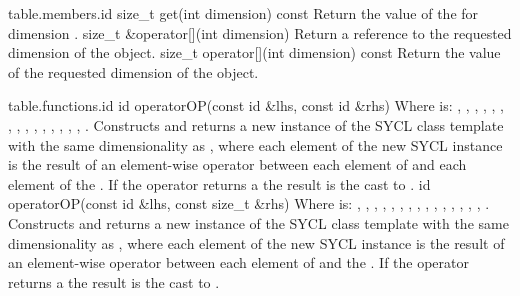 {table.members.id}
  \addRow
    {size_t get(int dimension) const}
    {
        Return the value of the  for dimension
        .
    }
  \addRow
    {size_t \&operator[](int dimension)}
    {
        Return a reference to the requested dimension of the 
        object.
    }
  \addRow
    {size_t operator[](int dimension) const}
    {
        Return the value of the requested dimension of the 
        object.
    }
\completeTable

{table.functions.id}
  \addRow
    { id operatorOP(const id \&lhs, const id \&rhs) }
    {
      Where  is: \codeinline{+}, \codeinline{-}, \codeinline{*},
      \codeinline{/}, \codeinline{\%}, \codeinline{<<}, \codeinline{>>},
      \codeinline{\&}, \codeinline{|}, \codeinline{^},
      \codeinline{\&\&}, \codeinline{||},
      \codeinline{<}, \codeinline{>}, \codeinline{<=},
      \codeinline{>=}.
      \newline
      Constructs and returns a new instance of the SYCL  class
      template with the same dimensionality as  , where
      each element of the new SYCL  instance is the result of an
      element-wise  operator between each element of 
       and each element of the  .
      If the operator returns a  the result is the cast to
      .
    }
  \addRow
    { id operatorOP(const id \&lhs, const size_t \&rhs) }
    {
      Where  is: \codeinline{+}, \codeinline{-}, \codeinline{*},
      \codeinline{/}, \codeinline{\%}, \codeinline{<<}, \codeinline{>>},
      \codeinline{\&}, \codeinline{|}, \codeinline{^},
      \codeinline{\&\&}, \codeinline{||},
      \codeinline{<}, \codeinline{>}, \codeinline{<=},
      \codeinline{>=}.
      \newline
      Constructs and returns a new instance of the SYCL  class
      template with the same dimensionality as  , where
      each element of the new SYCL  instance is the result of an
      element-wise  operator between each element of 
       and the  . If the
      operator returns a  the result is the cast to
      .
    }
